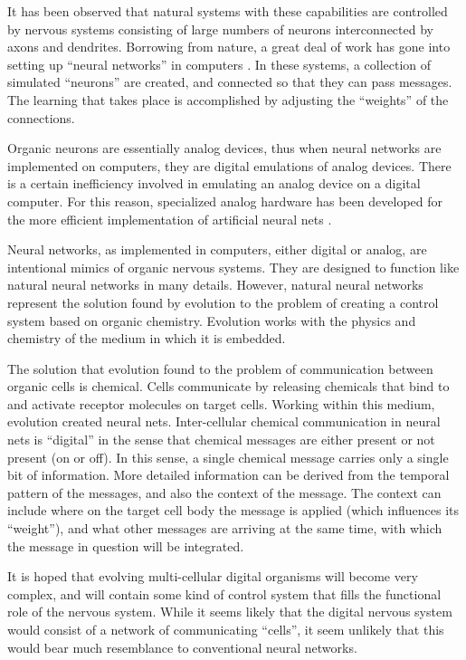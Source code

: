 It has been observed that natural systems with these capabilities
are controlled by nervous systems consisting of large numbers of
neurons interconnected by axons and dendrites.  Borrowing from nature,
a great deal of work has gone into setting up ``neural networks'' in
computers \cite{Dayh,HeKrPa}.  In these systems, a collection of simulated
``neurons'' are created, and connected so that they can pass messages.
The learning that takes place is accomplished by adjusting the
``weights'' of the connections.

Organic neurons are essentially analog devices, thus when neural networks
are implemented on computers, they are digital emulations of analog
devices.  There is a certain inefficiency involved in emulating
an analog device on a digital computer.  For this reason, specialized
analog hardware has been developed for the more efficient implementation
of artificial neural nets \cite{Mead}.

Neural networks, as implemented in computers, either digital or analog,
are intentional mimics of organic nervous systems.  They are designed
to function like natural neural networks in many details.  However,
natural neural networks represent the solution found by evolution to
the problem of creating a control system based on organic chemistry.
Evolution works with the physics and chemistry of the medium in which
it is embedded.

The solution that evolution found to the problem of communication
between organic cells is chemical.  Cells communicate by releasing
chemicals that bind to and activate receptor molecules on target
cells.  Working within this medium, evolution created neural nets.
Inter-cellular chemical communication in neural nets is ``digital''
in the sense that chemical messages are either present or not present
(on or off).  In this sense, a single chemical message carries only
a single bit of information.  More detailed information can be derived
from the temporal pattern of the messages, and also the context of
the message.  The context can include where on the target cell body
the message is applied (which influences its ``weight''), and what
other messages are arriving at the same time, with which the message
in question will be integrated.

It is hoped that evolving multi-cellular digital organisms will become
very complex, and will contain some kind of control system that fills
the functional role of the nervous system.  While it seems likely that
the digital nervous system would consist of a network of communicating
``cells'', it seem unlikely that this would bear much resemblance to
conventional neural networks.

